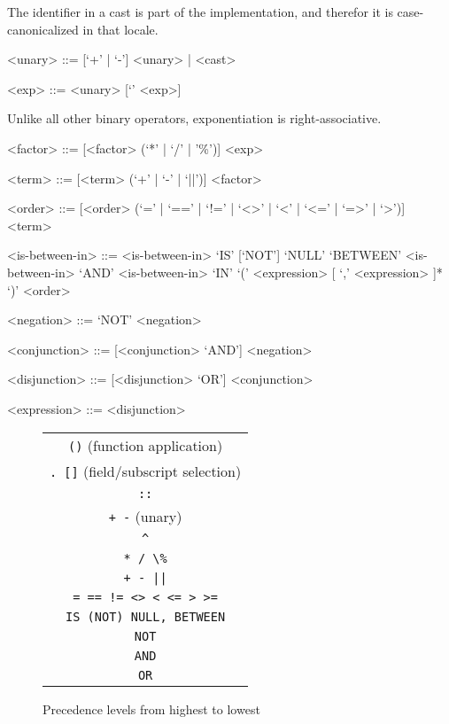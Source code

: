 \documentclass{article}
\begin{document}
The identifier in a cast is part of the \SoQL{} implementation, and
therefor it is case-canonicalized in that locale.

\begin{grammar}
<unary> ::= [`+' | `-'] <unary> | <cast>

<exp> ::= <unary> [`\caret' <exp>]
\end{grammar}

Unlike all other binary operators, exponentiation is right-associative.

\begin{grammar}
<factor> ::= [<factor> (`*' | `/' | '\%')] <exp>

<term> ::= [<term> (`+' | `-' | `||')] <factor>

<order> ::= [<order> (`=' | `==' | `!=' | `<>' | `<' | `<=' | `=>' | `>')] <term>

<is-between-in> ::= <is-between-in> `IS' [`NOT'] `NULL'
  `BETWEEN' <is-between-in> `AND' <is-between-in>
  `IN' `(' <expression>  [ `,' <expression> ]* `)'
 \alt <order>

<negation> ::= `NOT' <negation>

<conjunction> ::= [<conjunction> `AND'] <negation>

<disjunction> ::= [<disjunction> `OR'] <conjunction>

<expression> ::= <disjunction>
\end{grammar}

\begin{figure}
\begin{center}
\begin{tabular}{c}
\lstinline|()| (function application) \\
\lstinline|. []| (field/subscript selection) \\
\lstinline|::| \\
\lstinline|+ -| (unary) \\
\lstinline|^| \\
\lstinline|* / \%| \\
\lstinline!+ - ||! \\
\lstinline|= == != <> < <= > >=| \\
\lstinline|IS (NOT) NULL, BETWEEN| \\
\lstinline|NOT| \\
\lstinline|AND| \\
\lstinline|OR| \\
\end{tabular}
\end{center}
\caption{Precedence levels from highest to lowest}
\label{precedence}
\end{figure}
\end{document}
